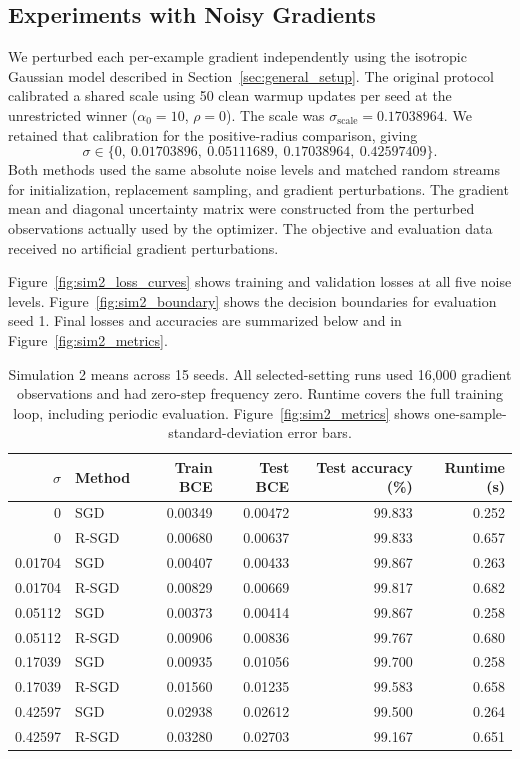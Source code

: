 \subsection{Experiments with Noisy Gradients}
\label{sec:sim2_noise}

We perturbed each per-example gradient independently using the isotropic
Gaussian model described in Section~\ref{sec:general_setup}.
The original protocol calibrated a shared scale using 50 clean warmup updates
per seed at the unrestricted winner ($\alpha_0=10$, $\rho=0$).
The scale was $\sigma_{\mathrm{scale}}=0.17038964$.
We retained that calibration for the positive-radius comparison, giving
\[
\sigma\in\{0,\ 0.01703896,\ 0.05111689,\ 0.17038964,\ 0.42597409\}.
\]
Both methods used the same absolute noise levels and matched random streams
for initialization, replacement sampling, and gradient perturbations.
The gradient mean and diagonal uncertainty matrix were constructed from the
perturbed observations actually used by the optimizer.
The objective and evaluation data received no artificial gradient perturbations.

Figure~\ref{fig:sim2_loss_curves} shows training and validation losses at all five
noise levels. Figure~\ref{fig:sim2_boundary} shows the decision boundaries for
evaluation seed 1. Final losses and accuracies are summarized below and in
Figure~\ref{fig:sim2_metrics}.

\begin{table}[htbp]
\centering
\small
\begin{tabular}{rlrrrr}
\toprule
$\sigma$ & Method & Train BCE & Test BCE & Test accuracy (\%) & Runtime (s)\\
\midrule
0       & SGD   & 0.00349 & 0.00472 & 99.833 & 0.252\\
0       & R-SGD & 0.00680 & 0.00637 & 99.833 & 0.657\\
0.01704 & SGD   & 0.00407 & 0.00433 & 99.867 & 0.263\\
0.01704 & R-SGD & 0.00829 & 0.00669 & 99.817 & 0.682\\
0.05112 & SGD   & 0.00373 & 0.00414 & 99.867 & 0.258\\
0.05112 & R-SGD & 0.00906 & 0.00836 & 99.767 & 0.680\\
0.17039 & SGD   & 0.00935 & 0.01056 & 99.700 & 0.258\\
0.17039 & R-SGD & 0.01560 & 0.01235 & 99.583 & 0.658\\
0.42597 & SGD   & 0.02938 & 0.02612 & 99.500 & 0.264\\
0.42597 & R-SGD & 0.03280 & 0.02703 & 99.167 & 0.651\\
\bottomrule
\end{tabular}
\caption{Simulation 2 means across 15 seeds. All selected-setting runs used
16,000 gradient observations and had zero-step frequency zero.
Runtime covers the full training loop, including periodic evaluation.
Figure~\ref{fig:sim2_metrics} shows one-sample-standard-deviation error bars.}
\label{tab:sim2_metrics}
\end{table}

